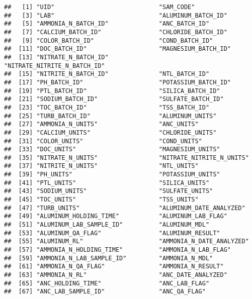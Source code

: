 \documentclass[]{article}
\begin{document}
\begin{verbatim}
##   [1] "UID"                             "SAM_CODE"                       
##   [3] "LAB"                             "ALUMINUM_BATCH_ID"              
##   [5] "AMMONIA_N_BATCH_ID"              "ANC_BATCH_ID"                   
##   [7] "CALCIUM_BATCH_ID"                "CHLORIDE_BATCH_ID"              
##   [9] "COLOR_BATCH_ID"                  "COND_BATCH_ID"                  
##  [11] "DOC_BATCH_ID"                    "MAGNESIUM_BATCH_ID"             
##  [13] "NITRATE_N_BATCH_ID"              "NITRATE_NITRITE_N_BATCH_ID"     
##  [15] "NITRITE_N_BATCH_ID"              "NTL_BATCH_ID"                   
##  [17] "PH_BATCH_ID"                     "POTASSIUM_BATCH_ID"             
##  [19] "PTL_BATCH_ID"                    "SILICA_BATCH_ID"                
##  [21] "SODIUM_BATCH_ID"                 "SULFATE_BATCH_ID"               
##  [23] "TOC_BATCH_ID"                    "TSS_BATCH_ID"                   
##  [25] "TURB_BATCH_ID"                   "ALUMINUM_UNITS"                 
##  [27] "AMMONIA_N_UNITS"                 "ANC_UNITS"                      
##  [29] "CALCIUM_UNITS"                   "CHLORIDE_UNITS"                 
##  [31] "COLOR_UNITS"                     "COND_UNITS"                     
##  [33] "DOC_UNITS"                       "MAGNESIUM_UNITS"                
##  [35] "NITRATE_N_UNITS"                 "NITRATE_NITRITE_N_UNITS"        
##  [37] "NITRITE_N_UNITS"                 "NTL_UNITS"                      
##  [39] "PH_UNITS"                        "POTASSIUM_UNITS"                
##  [41] "PTL_UNITS"                       "SILICA_UNITS"                   
##  [43] "SODIUM_UNITS"                    "SULFATE_UNITS"                  
##  [45] "TOC_UNITS"                       "TSS_UNITS"                      
##  [47] "TURB_UNITS"                      "ALUMINUM_DATE_ANALYZED"         
##  [49] "ALUMINUM_HOLDING_TIME"           "ALUMINUM_LAB_FLAG"              
##  [51] "ALUMINUM_LAB_SAMPLE_ID"          "ALUMINUM_MDL"                   
##  [53] "ALUMINUM_QA_FLAG"                "ALUMINUM_RESULT"                
##  [55] "ALUMINUM_RL"                     "AMMONIA_N_DATE_ANALYZED"        
##  [57] "AMMONIA_N_HOLDING_TIME"          "AMMONIA_N_LAB_FLAG"             
##  [59] "AMMONIA_N_LAB_SAMPLE_ID"         "AMMONIA_N_MDL"                  
##  [61] "AMMONIA_N_QA_FLAG"               "AMMONIA_N_RESULT"               
##  [63] "AMMONIA_N_RL"                    "ANC_DATE_ANALYZED"              
##  [65] "ANC_HOLDING_TIME"                "ANC_LAB_FLAG"                   
##  [67] "ANC_LAB_SAMPLE_ID"               "ANC_QA_FLAG"                    

\end{verbatim}
\end{document}
